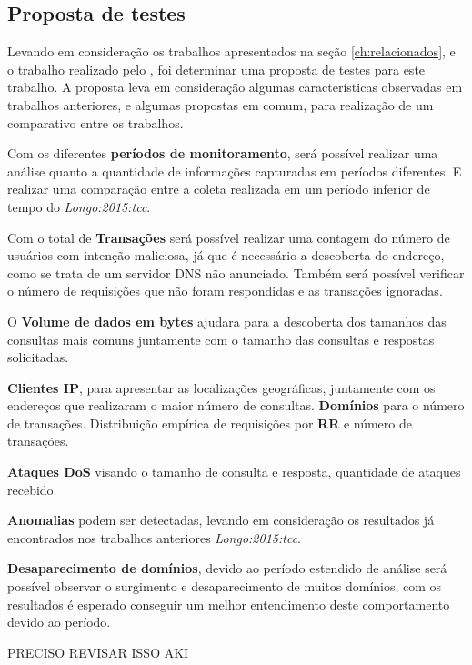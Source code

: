 \subsection{Proposta de testes}
\label{sec:proposta_testes}


Levando em consideração os trabalhos apresentados na seção \ref{ch:relacionados}, e o trabalho realizado pelo \cite{Longo:2015:tcc}, foi determinar uma proposta de testes para este trabalho. A proposta leva em consideração algumas características observadas em trabalhos anteriores, e algumas propostas em comum, para realização de um comparativo entre os trabalhos.

Com os diferentes \textbf{períodos de monitoramento}, será possível realizar uma análise quanto a quantidade de informações capturadas em períodos diferentes. E realizar uma comparação entre a coleta realizada em um período inferior de tempo do \textit{Longo:2015:tcc}.


Com o total de \textbf{Transações} será possível realizar uma contagem do número de usuários com intenção maliciosa, já que é necessário a descoberta do endereço, como se trata de um servidor DNS não anunciado. Também será possível verificar o número de requisições que não foram respondidas e as transações ignoradas.

O \textbf{Volume de dados em bytes} ajudara para a descoberta dos tamanhos das consultas mais comuns juntamente com o tamanho das consultas e respostas solicitadas.

\textbf{Clientes IP}, para apresentar as localizações geográficas, juntamente com os endereços que realizaram o maior número de consultas. \textbf{Domínios} para o número de transações. Distribuição empírica de requisições por \textbf{RR} e número de transações.

\textbf{Ataques DoS} visando o tamanho de consulta e resposta, quantidade de ataques recebido.

\textbf{Anomalias} podem ser detectadas, levando em consideração os resultados já encontrados nos trabalhos anteriores \textit{Longo:2015:tcc}.

\textbf{Desaparecimento de domínios}, devido ao período estendido de análise será possível observar o surgimento e desaparecimento de muitos domínios, com os resultados é esperado conseguir um melhor entendimento deste comportamento devido ao período.



PRECISO REVISAR ISSO AKI
